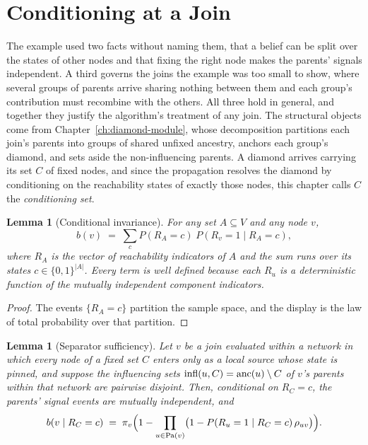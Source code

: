 \documentclass[12pt]{report}
\newtheorem{lemma}[theorem]{Lemma}
\begin{document}
\section{Conditioning at a Join}
\label{sec:pp-conditioning}

The example used two facts without naming them, that a belief can be split over the states of other nodes and that fixing the right node makes the parents' signals independent. A third governs the joins the example was too small to show, where several groups of parents arrive sharing nothing between them and each group's contribution must recombine with the others. All three hold in general, and together they justify the algorithm's treatment of any join. The structural objects come from Chapter~\ref{ch:diamond-module}, whose decomposition partitions each join's parents into groups of shared unfixed ancestry, anchors each group's diamond, and sets aside the non-influencing parents. A diamond arrives carrying its set $C$ of fixed nodes, and since the propagation resolves the diamond by conditioning on the reachability states of exactly those nodes, this chapter calls $C$ the \emph{conditioning set}.

\begin{lemma}[Conditional invariance]
\label{lem:pp-invariance}
For any set $A \subseteq V$ and any node $v$,
\[
b(v) \;=\; \sum_{c} P(R_A = c)\; P(R_v = 1 \mid R_A = c),
\]
where $R_A$ is the vector of reachability indicators of $A$ and the sum runs over its states $c \in \{0,1\}^{|A|}$. Every term is well defined because each $R_u$ is a deterministic function of the mutually independent component indicators.
\end{lemma}

\begin{proof}
The events $\{R_A = c\}$ partition the sample space, and the display is the law of total probability over that partition.
\end{proof}

\begin{lemma}[Separator sufficiency]
\label{lem:pp-separator}
Let $v$ be a join evaluated within a network in which every node of a fixed set $C$ enters only as a local source whose state is pinned, and suppose the influencing sets $\mathrm{infl}(u, C) = \mathrm{anc}(u) \setminus C$ of $v$'s parents within that network are pairwise disjoint. Then, conditional on $R_C = c$, the parents' signal events are mutually independent, and
\[
b(v \mid R_C = c) \;=\; \pi_v \Bigl( 1 - \prod_{u \in \mathrm{Pa}(v)} \bigl( 1 - P(R_u = 1 \mid R_C = c)\,\rho_{uv} \bigr) \Bigr).
\]
\end{lemma}
\end{document}
